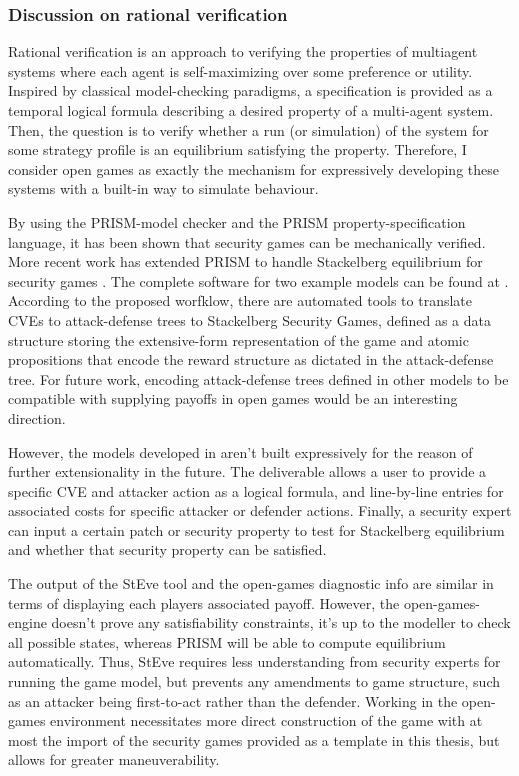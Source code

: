 \subsubsection{Discussion on rational verification}
Rational verification is an approach to verifying the properties of multiagent systems where each agent is self-maximizing over some preference or utility. Inspired by classical model-checking paradigms, a specification is provided as a temporal logical formula describing a desired property of a multi-agent system. Then, the question is to verify whether a run (or simulation) of the system for some strategy profile is an equilibrium satisfying the property. Therefore, I consider open games as exactly the mechanism for expressively developing these systems with a built-in way to simulate behaviour. 

By using the PRISM-model checker and the PRISM property-specification language, it has been shown that security games can be mechanically verified. More recent work has extended PRISM to handle Stackelberg equilibrium for security games \cite{Phetmanee2024}. The complete software for two example models can be found at \cite{phetmanee_2024_13338608}. According to the proposed worfklow, there are automated tools to translate CVEs to attack-defense trees to Stackelberg Security Games, defined as a data structure storing the extensive-form representation of the game and atomic propositions that encode the reward structure as dictated in the attack-defense tree. For future work, encoding attack-defense trees defined in other models to be compatible with supplying payoffs in open games would be an interesting direction.

However, the models developed in \cite{Phetmanee2024} aren't built expressively for the reason of further extensionality in the future. The deliverable allows a user to provide a specific CVE and attacker action as a logical formula, and line-by-line entries for associated costs for specific attacker or defender actions. Finally, a security expert can input a certain patch or security property to test for Stackelberg equilibrium and whether that security property can be satisfied. 

The output of the StEve tool and the open-games diagnostic info are similar in terms of displaying each players associated payoff. However, the open-games-engine doesn't prove any satisfiability constraints, it's up to the modeller to check all possible states, whereas PRISM will be able to compute equilibrium automatically. Thus, StEve requires less understanding from security experts for running the game model, but prevents any amendments to game structure, such as an attacker being first-to-act rather than the defender. Working in the open-games environment necessitates more direct construction of the game with at most the import of the security games provided as a template in this thesis, but allows for greater maneuverability.

